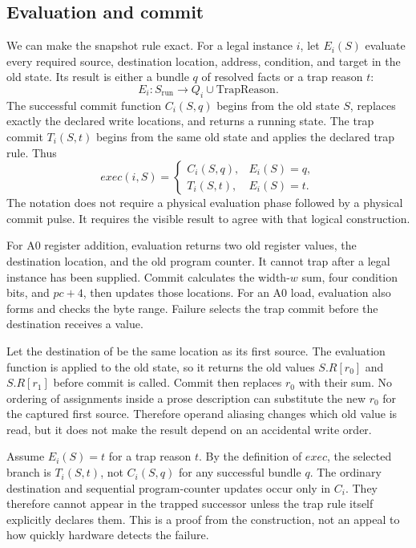 \subsection{Evaluation and commit}

We can make the snapshot rule exact. For a legal instance \(i\), let
\(E_i(S)\) evaluate every required source, destination location, address,
condition, and target in the old state. Its result is either a bundle \(q\) of
resolved facts or a trap reason \(t\):
\[
 E_i:S_{\mathrm{run}}\longrightarrow Q_i\mathbin{\cup}\mathrm{TrapReason}.
\]
The successful commit function \(C_i(S,q)\) begins from the old state \(S\),
replaces exactly the declared write locations, and returns a running state.
The trap commit \(T_i(S,t)\) begins from the same old state and applies the
declared trap rule. Thus
\[
 \mathit{exec}(i,S)=
 \left\{\begin{array}{ll}
 C_i(S,q), & E_i(S)=q,\\
 T_i(S,t), & E_i(S)=t.
 \end{array}\right.
\]
The notation does not require a physical evaluation phase followed by a
physical commit pulse. It requires the visible result to agree with that
logical construction.

For A0 register addition, evaluation returns two old register values, the
destination location, and the old program counter. It cannot trap after a
legal instance has been supplied. Commit calculates the width-\(w\) sum, four
condition bits, and \(pc+4\), then updates those locations. For an A0 load,
evaluation also forms and checks the byte range. Failure selects the trap
commit before the destination receives a value.

\begin{proofkit}[title={Aliased sources still use old values}]
Let the destination of  be the same location as its first
source. The evaluation function is applied to the old state, so it returns
the old values \(S.R[r_0]\) and \(S.R[r_1]\) before commit is called. Commit
then replaces \(r_0\) with their sum. No ordering of assignments inside a
prose description can substitute the new \(r_0\) for the captured first
source. Therefore operand aliasing changes which old value is read, but it
does not make the result depend on an accidental write order.
\end{proofkit}

\begin{proofkit}[title={A failed evaluation cannot expose an ordinary write}]
Assume \(E_i(S)=t\) for a trap reason \(t\). By the definition of
\(\mathit{exec}\), the selected branch is \(T_i(S,t)\), not \(C_i(S,q)\) for
any successful bundle \(q\). The ordinary destination and sequential
program-counter updates occur only in \(C_i\). They therefore cannot appear in
the trapped successor unless the trap rule itself explicitly declares them.
This is a proof from the construction, not an appeal to how quickly hardware
detects the failure.
\end{proofkit}

